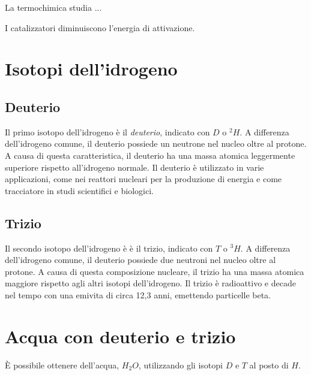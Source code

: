 \documentclass[a4paper]{article}
\begin{document}
La termochimica studia ...


I catalizzatori diminuiscono l'energia di attivazione.


\pagebreak

\section{Isotopi dell'idrogeno}

\subsection{Deuterio}

Il primo isotopo dell'idrogeno è il \textit{deuterio}, indicato con \(D\) o \(^2H\).
A differenza dell'idrogeno comune, il deuterio possiede un neutrone nel nucleo oltre al protone.
A causa di questa caratteristica, il deuterio ha una massa atomica leggermente superiore rispetto all'idrogeno normale.
Il deuterio è utilizzato in varie applicazioni, come nei reattori nucleari per la produzione di energia e come tracciatore in studi scientifici e biologici. 

\subsection{Trizio}

Il secondo isotopo dell'idrogeno è è il trizio, indicato con \(T\) o \(^3H\).
A differenza dell'idrogeno comune, il deuterio possiede due neutroni nel nucleo oltre al protone.
A causa di questa composizione nucleare, il trizio ha una massa atomica maggiore rispetto agli altri isotopi dell'idrogeno.
Il trizio è radioattivo e decade nel tempo con una emivita di circa 12,3 anni, emettendo particelle beta.

\section{Acqua con deuterio e trizio}

È possibile ottenere dell'acqua, \(H_2O\), utilizzando gli isotopi \(D\) e \(T\) al posto di \(H\).
\end{document}
